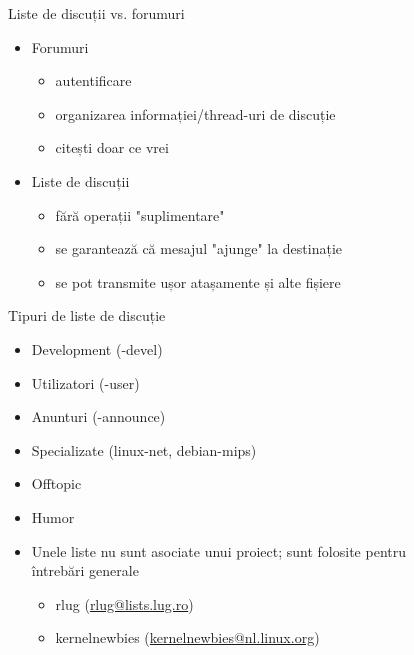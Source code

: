 \documentclass{beamer}
\begin{document}
    \begin{frame}{Liste de discuții vs. forumuri}
    \begin{itemize}
    \setlength{\itemsep}{0.6cm}
    \item Forumuri
        \begin{itemize}
        \setlength{\itemsep}{0.3cm}
        \item autentificare
        \item organizarea informației/thread-uri de discuție
        \item citești doar ce vrei
        \end{itemize}
    \item Liste de discuții
        \begin{itemize}
        \setlength{\itemsep}{0.3cm}
        \item fără operații "suplimentare"
        \item se garantează că mesajul "ajunge" la destinație
        \item se pot transmite ușor atașamente și alte fișiere
        \end{itemize}
    \end{itemize}
    \end{frame}

    \begin{frame}{Tipuri de liste de discuție}
    \begin{itemize}
    \setlength{\itemsep}{0.3cm}
    \item Development (-devel)
    \item Utilizatori (-user)
    \item Anunturi (-announce)
    \item Specializate (linux-net, debian-mips)
    \item Offtopic
    \item Humor
    \item Unele liste nu sunt asociate unui proiect; sunt folosite pentru \\
        întrebări generale
        \begin{itemize}
        \item rlug (\url{rlug@lists.lug.ro})
        \item kernelnewbies (\url{kernelnewbies@nl.linux.org})
        \end{itemize}
    \end{itemize}
    \end{frame}
\end{document}
